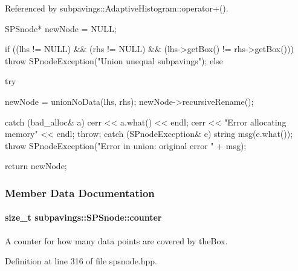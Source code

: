\-Referenced by subpavings\-::\-Adaptive\-Histogram\-::operator+().


\begin{DoxyCode}
    {
        SPSnode* newNode = NULL;

        if ((lhs != NULL) && (rhs != NULL) && (lhs->getBox() != rhs->getBox()))
        {
            throw SPnodeException("Union unequal subpavings");
        }
        else {
            try {

                newNode = unionNoData(lhs, rhs);
                newNode->recursiveRename();
            }
            catch (bad_alloc& a) {
                cerr << a.what() << endl;
                cerr << "Error allocating memory" << endl;
                throw;
            }
            catch (SPnodeException& e) {
                string msg(e.what());
                throw SPnodeException("Error in union: original error " + msg);
            }
        }

        return newNode;

    }
\end{DoxyCode}


\subsubsection{\-Member \-Data \-Documentation}
\hypertarget{classsubpavings_1_1SPSnode_a890b23bcab9091b420d88b99d16badc5}{
\paragraph[{counter}]{\setlength{\rightskip}{0pt plus 5cm}size\-\_\-t {\bf subpavings\-::\-S\-P\-Snode\-::counter}}}\label{classsubpavings_1_1SPSnode_a890b23bcab9091b420d88b99d16badc5}


\-A counter for how many data points are covered by the\-Box. 



\-Definition at line 316 of file spsnode.\-hpp.



